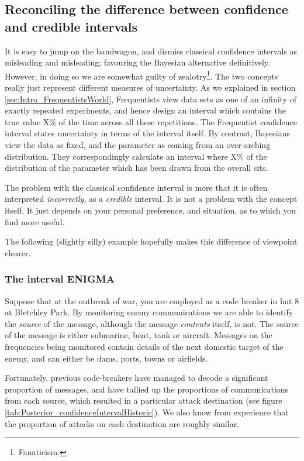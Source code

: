 \documentclass[11pt,fullpage]{book}
\begin{document}
\subsection{Reconciling the difference between confidence and credible intervals}
It is easy to jump on the bandwagon, and dismiss classical confidence intervals as misleading and misleading; favouring the Bayesian alternative definitively. However, in doing so we are somewhat guilty of zealotry\footnote{Fanaticism.}. The two concepts really just represent different measures of uncertainty. As we explained in section \ref{sec:Intro_FrequentistsWorld}, Frequentists view data sets as one of an infinity of exactly repeated experiments, and hence design an interval which contains the true value X\% of the time across all these repetitions. The Frequentist confidence interval states uncertainty in terms of the interval itself. By contrast, Bayesians view the data as fixed, and the parameter as coming from an over-arching distribution. They correspondingly calculate an interval where X\% of the distribution of the parameter which has been drawn from the overall sits.

The problem with the classical confidence interval is more that it is often interpreted \textit{incorrectly}, as a \textit{credible} interval. It is not a problem with the concept itself. It just depends on your personal preference, and situation, as to which you find more useful.

The following (slightly silly) example hopefully makes this difference of viewpoint clearer. 

\subsubsection{The interval ENIGMA}
Suppose that at the outbreak of war, you are employed as a code breaker in hut 8 at Bletchley Park. By monitoring enemy communications we are able to identify the \textit{source} of the message, although the message \textit{contents} itself, is not. The source of the message is either submarine, boat, tank or aircraft. Messages on the frequencies being monitored contain details of the next domestic target of the enemy, and can either be dams, ports, towns or airfields.

Fortunately, previous code-breakers have managed to decode a significant proportion of messages, and have tallied up the proportions of communications from each source, which resulted in a particular attack destination (see figure \ref{tab:Posterior_confidenceIntervalHistoric}). We also know from experience that the proportion of attacks on each destination are roughly similar.
\end{document}
